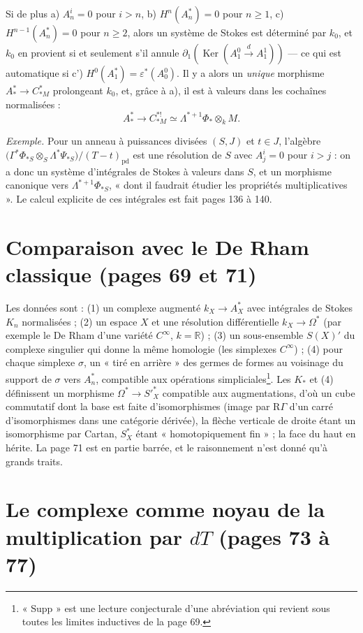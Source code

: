 \documentclass[11pt,a4paper]{article}
\begin{document}
Si de plus a) $A^i_n = 0$ pour $i > n$, b) $H^n(A^*_n) = 0$ pour $n \geq 1$,
c) $H^{n-1}(A^*_n) = 0$ pour $n \geq 2$, alors un système de Stokes est
déterminé par $k_0$, et $k_0$ en provient si et seulement s'il annule
$\partial_1(\operatorname{Ker}(A^0_1 \xrightarrow{d} A^1_1))$ — ce qui est
automatique si c') $H^0(A^*_1) = \varepsilon^*(A^0_0)$. Il y a alors un
\emph{unique} morphisme $A^*_* \to C^*_{*M}$ prolongeant $k_0$, et, grâce à a),
il est à valeurs dans les cochaînes normalisées :
\[
A^*_* \longrightarrow C^{*!}_{*M} \simeq \Lambda^{*+1}\Phi_* \otimes_k M .
\]

\emph{Exemple.} Pour un anneau à puissances divisées $(S, J)$ et $t \in J$,
l'algèbre $\bigl(\Gamma^*\Phi_{*S} \otimes_S \Lambda^*\Psi_{*S}\bigr)/(T -
t)_{\mathrm{pd}}$ est une résolution de $S$ avec $A^i_j = 0$ pour $i > j$ : on a
donc un système d'intégrales de Stokes à valeurs dans $S$, et un morphisme
canonique vers $\Lambda^{*+1}\Phi_{*S}$, « dont il faudrait étudier les
propriétés multiplicatives ». Le calcul explicite de ces intégrales est fait
pages 136 à 140.

\section*{Comparaison avec le De Rham classique (pages 69 et 71)}

Les données sont : (1) un complexe augmenté $k_X \to A^*_X$ avec intégrales de
Stokes $K_n$ normalisées ; (2) un espace $X$ et une résolution différentielle
$k_X \to \Omega^*$ (par exemple le De Rham d'une variété $C^\infty$, $k =
\mathbb{R}$) ; (3) un sous-ensemble $S(X)'$ du complexe singulier qui donne la
même homologie (les simplexes $C^\infty$) ; (4) pour chaque simplexe $\sigma$,
un « tiré en arrière » des germes de formes au voisinage du support de $\sigma$
vers $A^*_n$, compatible aux opérations simpliciales\footnote{« Supp » est une
lecture conjecturale d'une abréviation qui revient sous toutes les limites
inductives de la page 69.}. Les $K_*$ et (4) définissent un morphisme $\Omega^*
\to S'^*_X$ compatible aux augmentations, d'où un cube commutatif dont la base
est faite d'isomorphismes (image par $\mathrm{R}\Gamma$ d'un carré d'isomorphismes
dans une catégorie dérivée), la flèche verticale de droite étant un
isomorphisme par Cartan, $S^*_X$ étant « homotopiquement fin » ; la face du
haut en hérite. La page 71 est en partie barrée, et le raisonnement n'est
donné qu'à grands traits.

\section*{Le complexe comme noyau de la multiplication par $dT$ (pages 73 à 77)}
\end{document}
